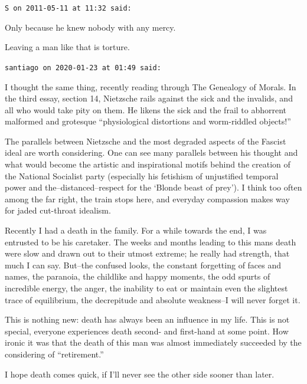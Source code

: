 \begin{footnotesize}
\begin{sffamily}
\texttt{S on 2011-05-11 at 11:32 said:}

Only because he knew nobody with any mercy.

Leaving a man like that is torture.

\hfill

\texttt{santiago on 2020-01-23 at 01:49 said:}

I thought the same thing, recently reading through The Genealogy of Morals. In the third essay, section 14, Nietzsche rails against the sick and the invalids, and all who would take pity on them. He likens the sick and the frail to abhorrent malformed and grotesque ``physiological distortions and worm-riddled objects!''

The parallels between Nietzsche and the most degraded aspects of the Fascist ideal are worth considering. One can see many parallels between his thought and what would become the artistic and inspirational motifs behind the creation of the National Socialist party (especially his fetishism of unjustified temporal power and the--distanced--respect for the `Blonde beast of prey'). I think too often among the far right, the train stops here, and everyday compassion makes way for jaded cut-throat idealism.

Recently I had a death in the family. For a while towards the end, I was entrusted to be his caretaker. The weeks and months leading to this mans death were slow and drawn out to their utmost extreme; he really had strength, that much I can say. But--the confused looks, the constant forgetting of faces and names, the paranoia, the childlike and happy moments, the odd spurts of incredible energy, the anger, the inability to eat or maintain even the slightest trace of equilibrium, the decrepitude and absolute weakness--I will never forget it.

This is nothing new: death has always been an influence in my life. This is not special, everyone experiences death second- and first-hand at some point. How ironic it was that the death of this man was almost immediately succeeded by the considering of ``retirement.''

I hope death comes quick, if I'll never see the other side sooner than later.


\hfill

\end{sffamily}
\end{footnotesize}

